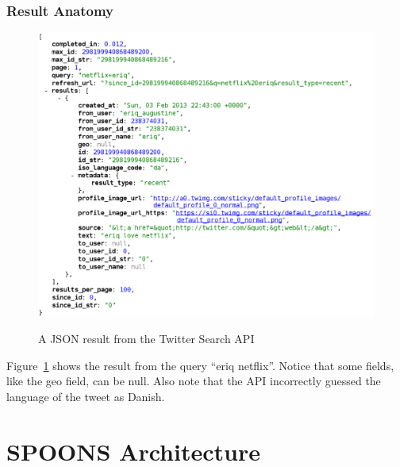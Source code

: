 \documentclass[12pt]{ucthesis}
\newcommand{\captionfonts}{\small\bf\ssp}
\begin{document}
\section{Result Anatomy}
\begin{figure}
   \begin{center}
      \includegraphics[width=150mm]{images/api_result.eps}
      \captionfonts
      \caption[Twitter Search API Result]{A JSON result from the Twitter Search API}
      \label{fig:apiRes}
   \end{center}
\end{figure}

Figure~\ref{fig:apiRes} shows the result from the query ``eriq netflix''. Notice that some fields,
like the \textsf{geo} field, can be null. Also note that the API incorrectly guessed the language of the tweet as Danish.

\part{SPOONS Architecture}
\label{arch}
\end{document}
